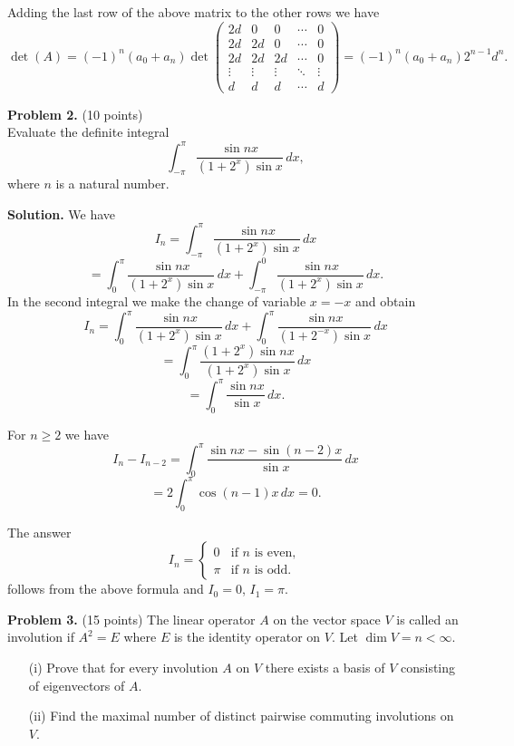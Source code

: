 \documentclass{article}
\begin{document}
Adding the last row of the above matrix to the other rows we have
\[
\det(A) = (-1)^n (a_0+a_n) \det \begin{pmatrix}
2d & 0 & 0 & \cdots & 0 \\
2d & 2d & 0 & \cdots & 0 \\
2d & 2d & 2d & \cdots & 0 \\
\vdots & \vdots & \vdots & \ddots & \vdots \\
d & d & d & \cdots & d
\end{pmatrix} = (-1)^n (a_0+a_n)2^{n-1}d^n.
\]

\textbf{Problem 2.} (10 points)\\
Evaluate the definite integral
\[
\int_{-\pi}^{\pi} \frac{\sin nx}{(1 + 2^x)\sin x} \, dx,
\]
where \( n \) is a natural number.

\textbf{Solution.} We have
\[
I_n = \int_{-\pi}^{\pi} \frac{\sin nx}{(1 + 2^x)\sin x} \, dx
\]
\[
= \int_{0}^{\pi} \frac{\sin nx}{(1 + 2^x)\sin x} \, dx + \int_{-\pi}^{0} \frac{\sin nx}{(1 + 2^x)\sin x} \, dx.
\]
In the second integral we make the change of variable \( x = -x \) and obtain
\[
I_n = \int_{0}^{\pi} \frac{\sin nx}{(1 + 2^x)\sin x} \, dx + \int_{0}^{\pi} \frac{\sin nx}{(1 + 2^{-x})\sin x} \, dx
\]
\[
= \int_{0}^{\pi} \frac{(1 + 2^x)\sin nx}{(1 + 2^x)\sin x} \, dx
\]
\[
= \int_{0}^{\pi} \frac{\sin nx}{\sin x} \, dx.
\]

For \( n \geq 2 \) we have
\[
I_n - I_{n-2} = \int_{0}^{\pi} \frac{\sin nx - \sin(n - 2)x}{\sin x} \, dx
\]
\[
= 2 \int_{0}^{\pi} \cos(n - 1)x \, dx = 0.
\]

The answer
\[
I_n = \begin{cases}
0 & \text{if } n \text{ is even}, \\
\pi & \text{if } n \text{ is odd}.
\end{cases}
\]
follows from the above formula and \( I_0 = 0 \), \( I_1 = \pi \).

\textbf{Problem 3.} (15 points)
The linear operator \( A \) on the vector space \( V \) is called an involution if \( A^2 = E \) where \( E \) is the identity operator on \( V \). Let \( \dim V = n < \infty \).
\begin{enumerate}
\item[(i)] Prove that for every involution \( A \) on \( V \) there exists a basis of \( V \) consisting of eigenvectors of \( A \).
\item[(ii)] Find the maximal number of distinct pairwise commuting involutions on \( V \).
\end{enumerate}
\end{document}
